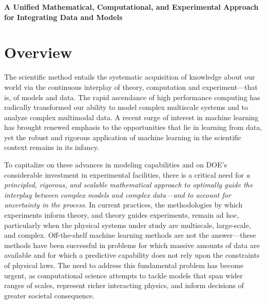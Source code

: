 \documentclass[11pt]{article}
\begin{document}
\begin{center}
{\large \textbf{ A Unified Mathematical, Computational, and
    Experimental Approach for Integrating Data and Models}}
\end{center}
%

\section{Overview}

The scientific method entails the systematic acquisition of knowledge
about our world via the continuous interplay of theory, computation
and experiment---that is, of models and data. The rapid ascendance of
high performance computing has radically transformed our ability to
model complex multiscale systems and to analyze complex multimodal
data. A recent surge of interest in machine learning has brought
renewed emphasis to the opportunities that lie in learning from data,
yet the robust and rigorous application of machine learning in the
scientific context remains in its infancy.

To capitalize on these advances in modeling capabilities and on DOE's
considerable investment in experimental facilities, there is a
critical need for {\em a principled, rigorous, and scalable
  mathematical approach to optimally guide the interplay between
  complex models and complex data---and to account for uncertainty in
  the process}.  In current practices, the methodologies by which
experiments inform theory, and theory guides experiments, remain ad
hoc, particularly when the physical systems under study are
multiscale, large-scale, and complex.  Off-the-shelf machine learning
methods are not the answer---these methods have been successful in
problems for which massive amounts of data are available and for which
a predictive capability does not rely upon the constraints of physical
laws.  The need to address this fundamental problem has become urgent,
as computational science attempts to tackle models that span wider
ranges of scales, represent richer interacting physics, and inform
decisions of greater societal consequence.
\end{document}
